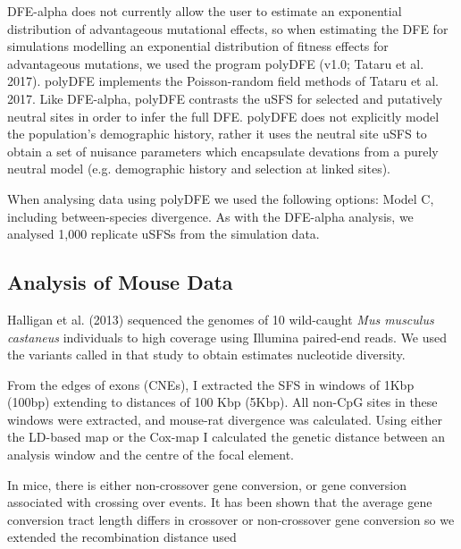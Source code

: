 \documentclass[11pt]{article}
\begin{document}
		DFE-alpha does not currently allow the user to estimate an exponential distribution of advantageous mutational effects, so when estimating the DFE for simulations modelling an exponential distribution of fitness effects for advantageous mutations, we used the program polyDFE (v1.0; Tataru et al. 2017). polyDFE implements the Poisson-random field methods of Tataru et al. 2017. Like DFE-alpha, polyDFE contrasts the uSFS for selected and putatively neutral sites in order to infer the full DFE. polyDFE does not explicitly model the population's demographic history, rather it uses the neutral site uSFS to obtain a set of nuisance parameters which encapsulate devations from a purely neutral model (e.g. demographic history and selection at linked sites).
		
	 When analysing data using polyDFE we used the following options: Model C, including between-species divergence. As with the DFE-alpha analysis, we analysed 1,000 replicate uSFSs from the simulation data.

	\subsection*{Analysis of Mouse Data}

Halligan et al. (2013) sequenced the genomes of 10 wild-caught \emph{Mus musculus castaneus} individuals to high coverage using Illumina paired-end reads. We used the variants called in that study to obtain estimates nucleotide diversity.

From the edges of exons (CNEs), I extracted the SFS in windows of 1Kbp (100bp) extending to distances of 100 Kbp (5Kbp). All non-CpG sites in these windows were extracted, and mouse-rat divergence was calculated. Using either the LD-based map or the Cox-map I calculated the genetic distance between an analysis window and the centre of the focal element. 

	In mice, there is either non-crossover gene conversion, or gene conversion associated with crossing over events. It has been shown that the average gene conversion tract length differs in crossover or non-crossover gene conversion so we extended the recombination distance used 
\end{document}
